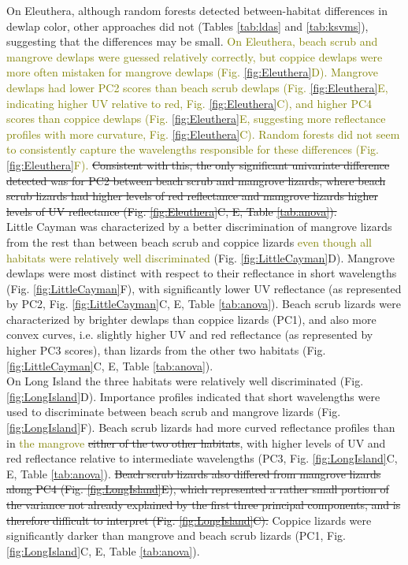 On Eleuthera, although random forests detected between-habitat differences in dewlap color, other approaches did not (Tables \ref{tab:ldas} and \ref{tab:ksvms}), suggesting that the differences may be small. \textcolor{olive}{On Eleuthera, beach scrub and mangrove dewlaps were guessed relatively correctly, but coppice dewlaps were more often mistaken for mangrove dewlaps (Fig. \ref{fig:Eleuthera}D). Mangrove dewlaps had lower PC2 scores than beach scrub dewlaps (Fig. \ref{fig:Eleuthera}E, indicating higher UV relative to red, Fig. \ref{fig:Eleuthera}C), and higher PC4 scores than coppice dewlaps (Fig. \ref{fig:Eleuthera}E, suggesting more reflectance profiles with more curvature, Fig. \ref{fig:Eleuthera}C). Random forests did not seem to consistently capture the wavelengths responsible for these differences (Fig. \ref{fig:Eleuthera}F).} \sout{Consistent with this, the only significant univariate difference detected was for PC2 between beach scrub and mangrove lizards, where beach scrub lizards had higher levels of red reflectance and mangrove lizards higher levels of UV reflectance (Fig. \ref{fig:Eleuthera}C, E, Table \ref{tab:anova}).}\\

Little Cayman was characterized by a better discrimination of mangrove lizards from the rest than between beach scrub and coppice lizards \textcolor{olive}{even though all habitats were relatively well discriminated} (Fig. \ref{fig:LittleCayman}D). Mangrove dewlaps were most distinct with respect to their reflectance in short wavelengths (Fig. \ref{fig:LittleCayman}F), with significantly lower UV reflectance (as represented by PC2, Fig. \ref{fig:LittleCayman}C, E, Table \ref{tab:anova}). Beach scrub lizards were characterized by brighter dewlaps than coppice lizards (PC1), and also more convex curves, i.e. slightly higher UV and red reflectance (as represented by higher PC3 scores), than lizards from the other two habitats (Fig. \ref{fig:LittleCayman}C, E, Table \ref{tab:anova}).\\

On Long Island the three habitats were relatively well discriminated (Fig. \ref{fig:LongIsland}D). Importance profiles indicated that short wavelengths were used to discriminate between beach scrub and mangrove lizards (Fig. \ref{fig:LongIsland}F). Beach scrub lizards had more curved reflectance profiles than in \textcolor{olive}{the mangrove} \sout{either of the two other habitats}, with higher levels of UV and red reflectance relative to intermediate wavelengths (PC3, Fig. \ref{fig:LongIsland}C, E, Table \ref{tab:anova}). \sout{Beach scrub lizards also differed from mangrove lizards along PC4 (Fig. \ref{fig:LongIsland}E), which represented a rather small portion of the variance not already explained by the first three principal components, and is therefore difficult to interpret (Fig. \ref{fig:LongIsland}C).} Coppice lizards were significantly darker than mangrove and beach scrub lizards (PC1, Fig. \ref{fig:LongIsland}C, E, Table \ref{tab:anova}).\\ 

